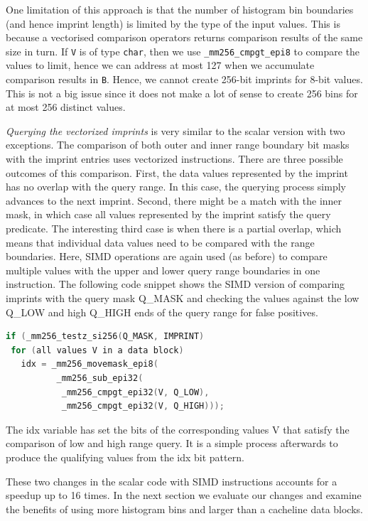 \documentclass[sigconf]{acmart}
\begin{document}
One limitation of this approach is that the number of histogram bin boundaries (and hence imprint length) is limited by the type of the input values. This is because a vectorised comparison operators returns comparison results of the same size in turn. If \texttt{V} is of type \texttt{char}, then we use \texttt{\_mm256\_cmpgt\_epi8} to compare the values to limit, hence we can address at most 127 when we accumulate comparison results in \texttt{B}. Hence, we cannot create 256-bit imprints for 8-bit values. This is not a big issue since it does not make a lot of sense to create 256 bins for at most 256 distinct values.

\emph{Querying the vectorized imprints} is very similar to the scalar version with two exceptions. The comparison of both outer and inner range boundary bit masks with the imprint entries uses vectorized instructions. There are three possible outcomes of this comparison. First, the data values represented by the imprint has no overlap with the query range. In this case, the querying process simply advances to the next imprint. Second, there might be a match with the inner mask, in which case all values represented by the imprint satisfy the query predicate. The interesting third case is when there is a partial overlap, which means that individual data values need to be compared with the range boundaries. Here, SIMD operations are again used (as before) to compare multiple values with the upper and lower query range boundaries in one instruction. The following code snippet shows the SIMD version of comparing imprints with the query mask Q\_MASK and checking the values against the low Q\_LOW and high Q\_HIGH ends of the query range for false positives.

\begin{lstlisting}[language=c]
if (_mm256_testz_si256(Q_MASK, IMPRINT)
 for (all values V in a data block)
   idx = _mm256_movemask_epi8(
          _mm256_sub_epi32(
           _mm256_cmpgt_epi32(V, Q_LOW),
           _mm256_cmpgt_epi32(V, Q_HIGH)));
\end{lstlisting}

The idx variable has set the bits of the corresponding values V that satisfy the comparison of low and high range query. It is a simple process afterwards to produce the qualifying values from the idx bit pattern.

These two changes in the scalar code with SIMD instructions accounts for a speedup up to 16 times. In the next section we evaluate our changes and examine the benefits of using more histogram bins and larger than a cacheline data blocks. 
\end{document}
